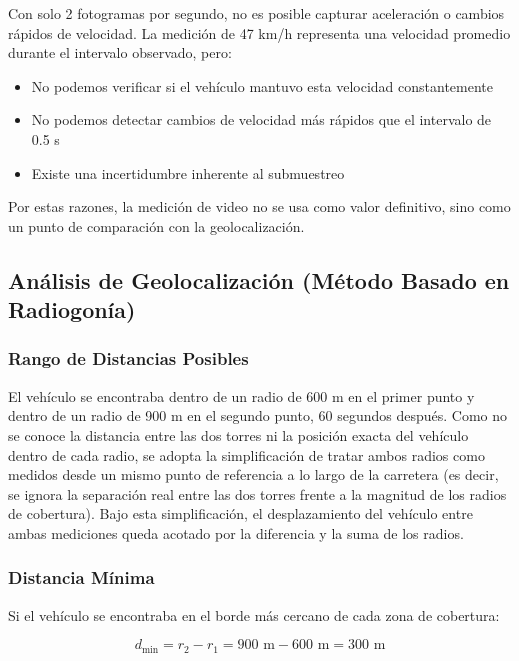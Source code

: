 \documentclass[12pt]{article}
\begin{document}
Con solo 2 fotogramas por segundo, no es posible capturar aceleración o cambios rápidos de velocidad. La medición de 47 km/h representa una velocidad promedio durante el intervalo observado, pero:

\begin{itemize}
    \item No podemos verificar si el vehículo mantuvo esta velocidad constantemente
    \item No podemos detectar cambios de velocidad más rápidos que el intervalo de 0.5 s
    \item Existe una incertidumbre inherente al submuestreo
\end{itemize}

Por estas razones, la medición de video no se usa como valor definitivo, sino como un punto de comparación con la geolocalización.

\subsection*{Análisis de Geolocalización (Método Basado en Radiogonía)}

\subsubsection*{Rango de Distancias Posibles}

El vehículo se encontraba dentro de un radio de 600 m en el primer punto y dentro de un radio de 900 m en el segundo punto, 60 segundos después. Como no se conoce la distancia entre las dos torres ni la posición exacta del vehículo dentro de cada radio, se adopta la simplificación de tratar ambos radios como medidos desde un mismo punto de referencia a lo largo de la carretera (es decir, se ignora la separación real entre las dos torres frente a la magnitud de los radios de cobertura). Bajo esta simplificación, el desplazamiento del vehículo entre ambas mediciones queda acotado por la diferencia y la suma de los radios.

\subsubsection*{Distancia Mínima}

Si el vehículo se encontraba en el borde más cercano de cada zona de cobertura:

\begin{equation}
d_{\min} = r_2 - r_1 = 900 \text{ m} - 600 \text{ m} = 300 \text{ m}
\end{equation}
\end{document}

